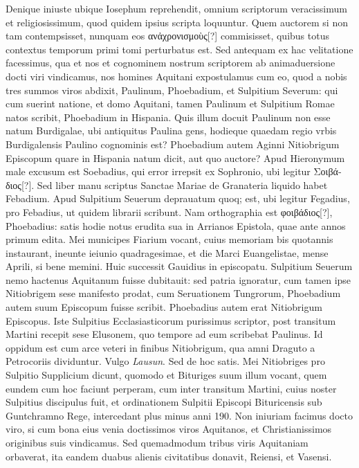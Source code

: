 Denique iniuste
ubique Iosephum reprehendit, omnium scriptorum veracissimum
et religiosissimum, quod quidem ipsius scripta loquuntur.
Quem
auctorem si non tam contempsisset, nunquam eos
 \textgreek{ανἀχρονισμοὺς}[?]
 commisisset,
quibus totus contextus temporum primi tomi perturbatus
est.
Sed antequam ex hac velitatione facessimus, qua et nos et cognominem
nostrum scriptorem ab animaduersione docti viri vindicamus,
nos homines Aquitani expostulamus cum eo, quod a nobis
tres summos viros abdixit, Paulinum, Phoebadium, et Sulpitium
Severum:
qui cum suerint natione, et domo Aquitani, tamen
Paulinum et Sulpitium Romae natos scribit, Phoebadium in Hispania.
Quis illum docuit Paulinum non esse natum Burdigalae, ubi
antiquitus Paulina gens, hodieque quaedam regio vrbis Burdigalensis
Paulino cognominis est?
Phoebadium autem Aginni Nitiobrigum
Episcopum quare in Hispania natum dicit, aut quo auctore?
Apud Hieronymum male excusum est Soebadius, qui error irrepsit
ex Sophronio, ubi legitur \textgreek{Σοιβάδιος[?]}.
Sed liber manu scriptus
Sanctae Mariae de Granateria liquido habet Febadium.
Apud Sulpitium
Seuerum deprauatum quoq; est, ubi legitur Fegadius, pro
Febadius, ut quidem librarii scribunt.
Nam orthographia est \textgreek{φοιβάδιος[?]},
Phoebadius: satis hodie notus erudita sua in Arrianos Epistola,
quae ante  annos primum edita.
Mei municipes Fiarium vocant,
cuius memoriam bis quotannis instaurant, ineunte ieiunio
quadragesimae, et die Marci Euangelistae, mense Aprili, si bene
memini.
Huic successit Gauidius in episcopatu.
Sulpitium Seuerum
nemo hactenus Aquitanum fuisse dubitauit: sed patria ignoratur,
cum tamen ipse Nitiobrigem sese manifesto prodat, cum Seruationem
Tungrorum, Phoebadium autem suum Episcopum fuisse scribit.
Phoebadius autem erat Nitiobrigum Episcopus.
Iste Sulpitius
Ecclasiasticorum purissimus scriptor, post transitum Martini recepit
sese Elusonem, quo tempore ad eum scribebat Paulinus.
Id oppidum est cum arce veteri in finibus Nitiobrigum, qua amni Draguto
a Petrocoriis dividuntur.
Vulgo \textit{Lausun}.
Sed de hoc satis.
Mei
Nitiobriges pro Sulpitio Supplicium dicunt, quomodo et Bituriges
suum illum vocant, quem eundem cum hoc faciunt perperam,
cum inter transitum Martini, cuius noster Sulpitius discipulus fuit,
et ordinationem Sulpitii Episcopi Bituricensis sub Guntchramno
Rege, intercedant plus minus anni 190.
Non iniuriam facimus
docto viro, si cum bona eius venia doctissimos viros Aquitanos,
et Christianissimos originibus suis vindicamus.
Sed quemadmodum tribus viris Aquitaniam orbaverat, ita eandem duabus
alienis civitatibus donavit, Reiensi, et Vasensi.

